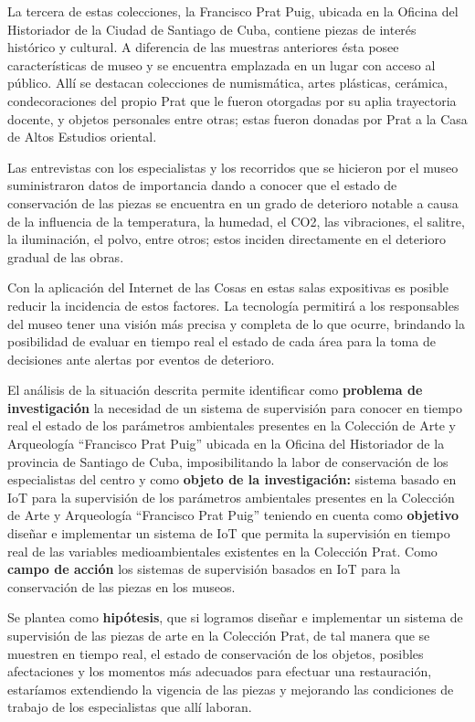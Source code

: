     La tercera de estas colecciones, la Francisco Prat Puig, ubicada en la Oficina del Historiador de la Ciudad de Santiago de Cuba, contiene piezas de interés histórico y cultural. A diferencia de las muestras anteriores ésta posee características de museo y se encuentra emplazada en un lugar con acceso al público. Allí se destacan colecciones de numismática, artes plásticas, cerámica, condecoraciones del propio Prat que le fueron otorgadas por su aplia trayectoria docente, y objetos personales entre otras; estas fueron donadas por Prat a la Casa de Altos Estudios oriental.

    Las entrevistas con los especialistas y los recorridos que se hicieron por el museo suministraron datos de importancia dando a conocer que el estado de conservación de las piezas se encuentra en un grado de deterioro notable a causa de la influencia de la temperatura, la humedad, el CO2, las vibraciones, el salitre, la iluminación, el polvo, entre otros; estos inciden directamente en el deterioro gradual de las obras.
    
    Con la aplicación del Internet de las Cosas en estas salas expositivas es posible reducir la incidencia de estos factores. La tecnología permitirá a los responsables del museo tener una visión más precisa y completa de lo que ocurre, brindando la posibilidad de evaluar en tiempo real el estado de cada área para la toma de decisiones ante alertas por eventos de deterioro.
    
    El análisis de la situación descrita permite identificar como \textbf{problema de investigación} la necesidad de un sistema de supervisión para conocer en tiempo real el estado de los parámetros ambientales presentes en la Colección de Arte y Arqueología “Francisco Prat Puig” ubicada en la Oficina del Historiador de la provincia de Santiago de Cuba, imposibilitando la labor de conservación de los especialistas del centro y como
    \textbf{objeto de la investigación:} sistema basado en IoT para la supervisión de los parámetros ambientales presentes en la Colección de Arte y Arqueología “Francisco Prat Puig” teniendo en cuenta como \textbf{objetivo} diseñar e implementar un sistema de IoT que permita la supervisión en tiempo real de las variables medioambientales existentes en la Colección Prat. Como \textbf{campo de acción} los sistemas de supervisión basados en IoT para la conservación de las piezas en los museos.

    Se plantea como \textbf{hipótesis}, que si logramos diseñar e implementar un sistema de supervisión de las piezas de arte en la Colección Prat, de tal manera que se muestren en tiempo real, el estado de conservación de los objetos, posibles afectaciones y los momentos más adecuados para efectuar una restauración, estaríamos extendiendo la vigencia de las piezas  y mejorando las condiciones de trabajo de los especialistas que allí laboran.\\
    
